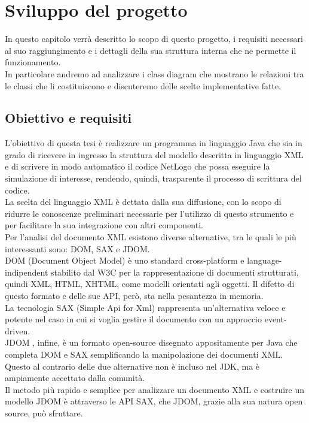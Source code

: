\chapter{Sviluppo del progetto}
\label{cap:sviluppo-progetto}
In questo capitolo verrà descritto lo scopo di questo progetto, i requisiti necessari al suo raggiungimento e i dettagli della sua struttura interna che ne permette il funzionamento. \\
In particolare andremo ad analizzare i class diagram che mostrano le relazioni tra le classi che li costituiscono e discuteremo delle scelte implementative fatte.

\section{Obiettivo e requisiti}
L'obiettivo di questa tesi è realizzare un programma in linguaggio Java che sia in grado di ricevere in ingresso la struttura del modello descritta in linguaggio XML e di scrivere in modo automatico il codice NetLogo che possa eseguire la simulazione di interesse, rendendo, quindi, trasparente il processo di scrittura del codice.\\
La scelta del linguaggio XML è dettata dalla sua diffusione, con lo scopo di ridurre le conoscenze preliminari necessarie per l'utilizzo di questo strumento e per facilitare la sua integrazione con altri componenti.\\
Per l'analisi del documento XML esistono diverse alternative, tra le quali le più interessanti sono: DOM, SAX e JDOM.\\
DOM (Document Object Model) è uno standard cross-platform e language-indipendent stabilito dal W3C per la rappresentazione di documenti strutturati, quindi XML, HTML, XHTML, come modelli orientati agli oggetti. Il difetto di questo formato e delle sue API, però, sta nella pesantezza in memoria.\\
La tecnologia SAX (Simple Api for Xml) rappresenta un'alternativa veloce e potente nel caso in cui si voglia gestire il documento con un approccio event-driven.\\
JDOM \cite{jdom}, infine, è un formato open-source disegnato appositamente per Java che completa DOM e SAX semplificando la manipolazione dei documenti XML. Questo al contrario delle due alternative non è incluso nel JDK, ma è ampiamente accettato dalla comunità.\\
Il metodo più rapido e semplice per analizzare un documento XML e costruire un modello JDOM è attraverso le API SAX, che JDOM, grazie alla sua natura open source, può sfruttare.\\
